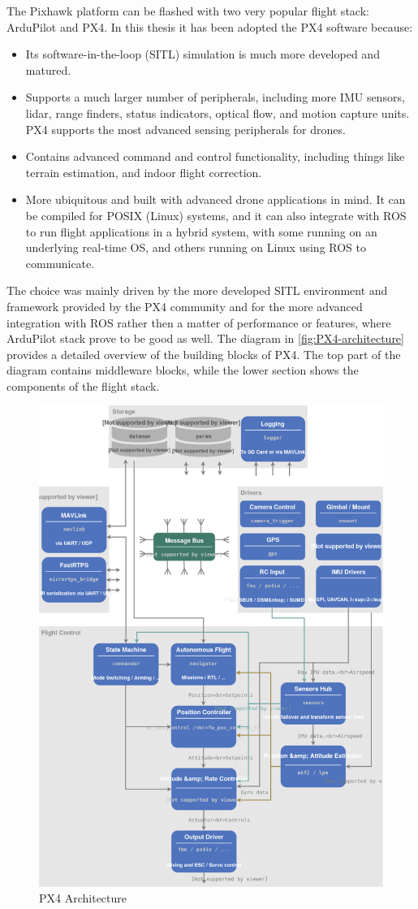 The Pixhawk platform can be flashed with two very popular flight stack: ArduPilot and PX4.
In this thesis it has been adopted the PX4 software because:
\begin{itemize}
	\item Its software-in-the-loop (SITL) simulation is much more developed and matured.
 	\item Supports a much larger number of peripherals, including more IMU sensors, lidar, range finders, status indicators, optical flow, and motion capture units. PX4 supports the most advanced sensing peripherals for drones.
 	\item Contains advanced command and control functionality, including things like terrain estimation, and indoor flight correction.
 	\item More ubiquitous and built with advanced drone applications in mind. It can be compiled for POSIX (Linux) systems, and it can also integrate with ROS to run flight applications in a hybrid system, with some running on an underlying real-time OS, and others running on Linux using ROS to communicate.
 \end{itemize} 
 The choice was mainly driven by the more developed SITL environment and framework provided by the PX4 community and for the more advanced integration with ROS rather then a matter of performance or features, where ArduPilot stack prove to be good as well.
 The diagram in \autoref{fig:PX4-architecture} provides a detailed overview of the building blocks of PX4. The top part of the diagram contains middleware blocks, while the lower section shows the components of the flight stack.
 \begin{figure}[ht]
    \centering
    \includegraphics[width=.6\textwidth]{figures/A1/PX4_Architecture.pdf}
    \caption{PX4 Architecture}
    \label{fig:PX4-architecture}
\end{figure}

